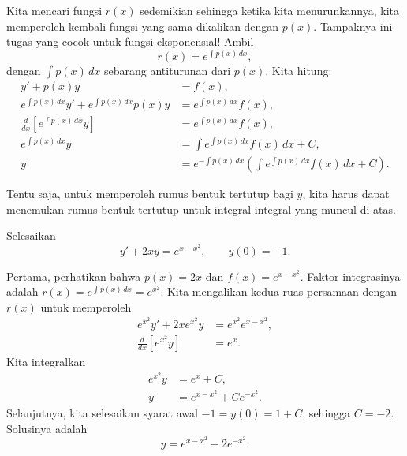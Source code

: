 Kita mencari fungsi $r(x)$ sedemikian sehingga ketika
kita menurunkannya, kita memperoleh kembali fungsi yang sama dikalikan dengan $p(x)$.
Tampaknya ini tugas yang cocok untuk fungsi eksponensial! Ambil
\begin{equation*}
r(x) = e^{\int p(x) \,dx} ,
\end{equation*}
dengan $\int p(x)\, dx$ sebarang antiturunan dari $p(x)$.
Kita hitung:
\begin{equation*}
\begin{aligned}
y' + p(x) y &= f(x) , \\
e^{\int p(x) \,dx} y' + e^{\int p(x) \,dx} p(x) y & = e^{\int p(x) \,dx} f(x) , \\
\frac{d}{dx}\left[ e^{\int p(x) \,dx} y \right] & = e^{\int p(x) \,dx} f(x) , \\
e^{\int p(x) \,dx} y & = \int e^{\int p(x) \,dx} f(x) \,dx + C , \\
y & = e^{-\int p(x) \,dx} \left( \int e^{\int p(x) \,dx} f(x) \,dx + C \right) .
\end{aligned}
\end{equation*}

Tentu saja, untuk memperoleh rumus bentuk tertutup bagi $y$,
kita harus dapat menemukan
rumus bentuk tertutup untuk integral-integral yang muncul di atas.

\begin{example}
Selesaikan
\begin{equation*}
y' + 2xy = e^{x-x^2}, \qquad y(0) = -1 .
\end{equation*}

Pertama, perhatikan bahwa $p(x) = 2x$ dan $f(x) = e^{x-x^2}$.
Faktor integrasinya adalah $r(x) = e^{\int p(x)\, dx} = e^{x^2}$.
Kita mengalikan kedua ruas persamaan dengan $r(x)$ untuk memperoleh
\begin{equation*}
\begin{aligned}
e^{x^2} y' + 2xe^{x^2}y & = e^{x^2} e^{x-x^2} , \\
\frac{d}{dx} \left[ e^{x^2} y \right] &= e^x .
\end{aligned}
\end{equation*}
Kita integralkan
\begin{equation*}
\begin{aligned}
e^{x^2} y &= e^x +C , \\
y &= e^{x-x^2} + C e^{-x^2} .
\end{aligned}
\end{equation*}
Selanjutnya, kita selesaikan syarat awal $-1 = y(0) = 1 + C$, sehingga $C=-2$.
Solusinya adalah
\begin{equation*}
y = e^{x-x^2} - 2 e^{-x^2} .
\end{equation*}
\end{example}

